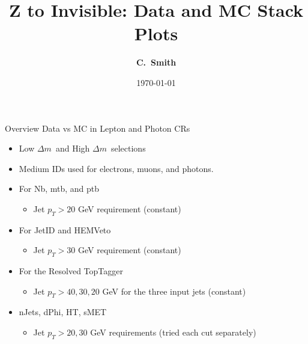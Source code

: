 \documentclass[10pt,xcolor=svgnames,fleqn,aspectratio=169]{beamer}
\title{Z to Invisible: Data and MC Stack Plots}
\author{\textcolor{DodgerBlueDark}{\bf C.~Smith\inst{1}}}
\institute{\inst{1} Baylor University}
\date{\today}
\newcommand{\dm}{$\Delta m$~}
\begin{document}
\begin{frame}[plain]
\maketitle
\end{frame}

\begin{frame}{Overview}
Data vs MC in Lepton and Photon CRs
\begin{itemize}
\item Low \dm and High \dm selections
\item Medium IDs used for electrons, muons, and photons.
\item For Nb, mtb, and ptb
\begin{itemize}
\item Jet $p_T > 20$ GeV requirement (constant)
\end{itemize}
\item For JetID and HEMVeto
\begin{itemize}
\item Jet $p_T > 30$ GeV requirement (constant)
\end{itemize}
\item For the Resolved TopTagger
\begin{itemize}
\item Jet $p_T > 40, 30, 20$ GeV for the three input jets (constant)
\end{itemize}
\item nJets, dPhi, HT, sMET
\begin{itemize}
\item Jet $p_T > 20, 30$ GeV requirements (tried each cut separately)
\end{itemize}
\end{itemize}
\end{frame}
\end{document}
